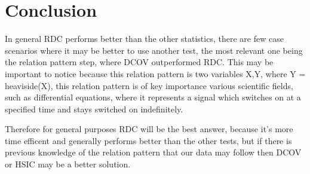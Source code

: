 \section{Conclusion}

In general RDC performs better than the other statistics, there are few case scenarios where it may be better to use another test, the most relevant one being the relation pattern step, where DCOV outperformed RDC. This may be important to notice because this relation pattern is two variables X,Y, where Y = heaviside(X), this relation pattern is of key importance various scientific fields, such as differential equations, where it represents a signal which switches on at a specified time and stays switched on indefinitely. 

Therefore for general purposes RDC will be the best answer, because it's more time efficent and generally performs better than the other tests, but if there is previous knowledge of the relation pattern that our data may follow then DCOV or HSIC may be a better solution.